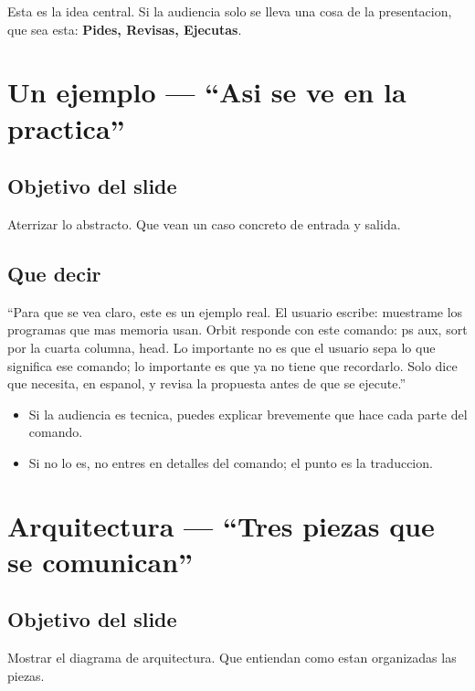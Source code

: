 \documentclass[12pt,a4paper]{article}
\begin{document}
\begin{tipbox}
Esta es la idea central. Si la audiencia solo se lleva una cosa de la presentacion, que sea esta: \textbf{Pides, Revisas, Ejecutas}.
\end{tipbox}

\section{Un ejemplo --- ``Asi se ve en la practica''}
\subsection{Objetivo del slide}
Aterrizar lo abstracto. Que vean un caso concreto de entrada y salida.

\subsection{Que decir}
\begin{frasebox}
``Para que se vea claro, este es un ejemplo real. El usuario escribe: muestrame los programas que mas memoria usan. Orbit responde con este comando: ps aux, sort por la cuarta columna, head. Lo importante no es que el usuario sepa lo que significa ese comando; lo importante es que ya no tiene que recordarlo. Solo dice que necesita, en espanol, y revisa la propuesta antes de que se ejecute.''
\end{frasebox}

\begin{itemize}
  \item Si la audiencia es tecnica, puedes explicar brevemente que hace cada parte del comando.
  \item Si no lo es, no entres en detalles del comando; el punto es la traduccion.
\end{itemize}

\section{Arquitectura --- ``Tres piezas que se comunican''}
\subsection{Objetivo del slide}
Mostrar el diagrama de arquitectura. Que entiendan como estan organizadas las piezas.
\end{document}
